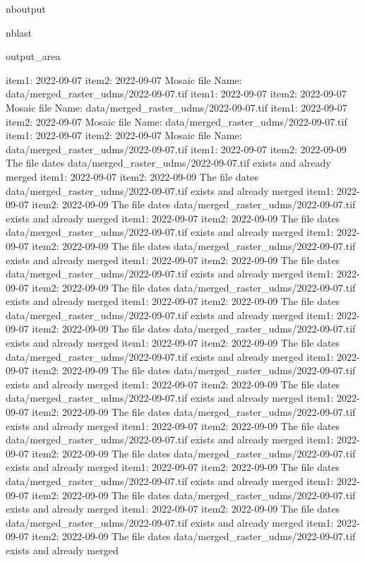 \documentclass[letterpaper,10pt]{sphinxmanual}
\begin{document}
\begin{sphinxuseclass}{nboutput}
\begin{sphinxuseclass}{nblast}
{\begin{sphinxuseclass}{output_area}
\begin{sphinxuseclass}{}
\begin{sphinxVerbatim}[commandchars=\\\{\}]
item1:  2022-09-07
item2:  2022-09-07
Mosaic file Name:  data/merged\_raster\_udms/2022-09-07.tif
item1:  2022-09-07
item2:  2022-09-07
Mosaic file Name:  data/merged\_raster\_udms/2022-09-07.tif
item1:  2022-09-07
item2:  2022-09-07
Mosaic file Name:  data/merged\_raster\_udms/2022-09-07.tif
item1:  2022-09-07
item2:  2022-09-07
Mosaic file Name:  data/merged\_raster\_udms/2022-09-07.tif
item1:  2022-09-07
item2:  2022-09-09
The file dates data/merged\_raster\_udms/2022-09-07.tif exists and already merged
item1:  2022-09-07
item2:  2022-09-09
The file dates data/merged\_raster\_udms/2022-09-07.tif exists and already merged
item1:  2022-09-07
item2:  2022-09-09
The file dates data/merged\_raster\_udms/2022-09-07.tif exists and already merged
item1:  2022-09-07
item2:  2022-09-09
The file dates data/merged\_raster\_udms/2022-09-07.tif exists and already merged
item1:  2022-09-07
item2:  2022-09-09
The file dates data/merged\_raster\_udms/2022-09-07.tif exists and already merged
item1:  2022-09-07
item2:  2022-09-09
The file dates data/merged\_raster\_udms/2022-09-07.tif exists and already merged
item1:  2022-09-07
item2:  2022-09-09
The file dates data/merged\_raster\_udms/2022-09-07.tif exists and already merged
item1:  2022-09-07
item2:  2022-09-09
The file dates data/merged\_raster\_udms/2022-09-07.tif exists and already merged
item1:  2022-09-07
item2:  2022-09-09
The file dates data/merged\_raster\_udms/2022-09-07.tif exists and already merged
item1:  2022-09-07
item2:  2022-09-09
The file dates data/merged\_raster\_udms/2022-09-07.tif exists and already merged
item1:  2022-09-07
item2:  2022-09-09
The file dates data/merged\_raster\_udms/2022-09-07.tif exists and already merged
item1:  2022-09-07
item2:  2022-09-09
The file dates data/merged\_raster\_udms/2022-09-07.tif exists and already merged
item1:  2022-09-07
item2:  2022-09-09
The file dates data/merged\_raster\_udms/2022-09-07.tif exists and already merged
item1:  2022-09-07
item2:  2022-09-09
The file dates data/merged\_raster\_udms/2022-09-07.tif exists and already merged
item1:  2022-09-07
item2:  2022-09-09
The file dates data/merged\_raster\_udms/2022-09-07.tif exists and already merged
item1:  2022-09-07
item2:  2022-09-09
The file dates data/merged\_raster\_udms/2022-09-07.tif exists and already merged
item1:  2022-09-07
item2:  2022-09-09
The file dates data/merged\_raster\_udms/2022-09-07.tif exists and already merged
item1:  2022-09-07
item2:  2022-09-09
The file dates data/merged\_raster\_udms/2022-09-07.tif exists and already merged
item1:  2022-09-07
item2:  2022-09-09
The file dates data/merged\_raster\_udms/2022-09-07.tif exists and already merged

\end{sphinxVerbatim}
\end{sphinxuseclass}
\end{sphinxuseclass}}
\end{sphinxuseclass}
\end{sphinxuseclass}
\end{document}
